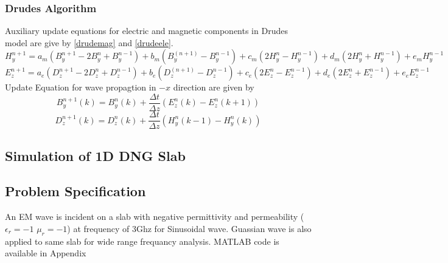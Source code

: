 
\subsubsection{Drudes Algorithm}
Auxiliary update equations for electric and magnetic components in Drudes model are give by \eqref{drudemag} and \eqref{drudeele}.
\begin{equation}
	H_y^{n+1} = a_m \left( B_y^{n+1} - 2B_y^n + B_y^{n-1} \right) + b_m \left( B_y^(n+1) - B_y^{n-1}  \right)+ 
c_m \left( 2H_y^n-H_y^{n-1} \right) + d_m \left( 2H_y^n + H_y^{n-1} \right) +e_m H_y^{n-1}
\label{drudemag}
\end{equation}
\begin{equation}
	E_z^{n+1} = a_e \left( D_z^{n+1} - 2D_z^n + D_z^{n-1} \right) + b_e \left( D_z^(n+1) - D_z^{n-1}  \right)+ 
c_e \left( 2E_z^n-E_z^{n-1} \right) + d_e \left( 2E_z^n + E_z^{n-1} \right) +e_e E_z^{n-1}
\label{drudeele}
\end{equation}
Update Equation for wave propagtion in $-x$ direction are given by 
\begin{equation}
	B_y^{n+1}(k)=  B_y^{n} (k) + \frac {\Delta t}{\Delta z} \left( E_z^n (k) - E_z^n (k+1) \right)
\label{drudeby}
\end{equation}
\begin{equation}
	D_z^{n+1}(k)=  D_z^{n} (k) + \frac {\Delta t}{\Delta z} \left( H_y^n (k-1) - H_y^n (k) \right)
\label{drudedz}
\end{equation}

\subsection{Simulation of 1D DNG Slab}
\subsection{Problem Specification}
An EM wave is incident on a slab with negative permittivity and permeability ($\epsilon_r= -1$ $\mu_r= -1$) at frequency of 3Ghz for Sinusoidal wave. Guassian wave is also applied to same slab for wide range frequancy analysis. MATLAB code is available in 
Appendix %
